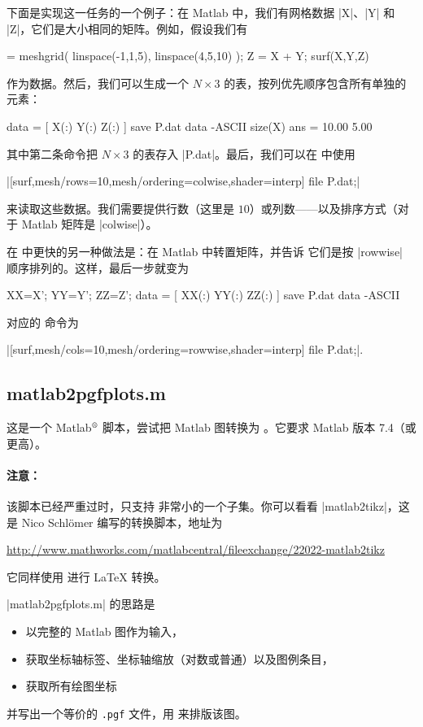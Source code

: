 {\begin{pgfgraphicnamed}
下面是实现这一任务的一个例子：在 Matlab 中，我们有网格数据 |X|、|Y| 和 |Z|，它们是大小相同的矩阵。例如，假设我们有
%
\begin{codeexample} = meshgrid( linspace(-1,1,5), linspace(4,5,10) );
Z = X + Y;
surf(X,Y,Z)
\end{codeexample}
%
\noindent 作为数据。然后，我们可以生成一个 $N \times 3$ 的表，按列优先顺序包含所有单独的元素：
%
\begin{codeexample}
data = [ X(:) Y(:) Z(:) ]
save P.dat data -ASCII
size(X)
ans =
   10.00    5.00
\end{codeexample}
%
\noindent 其中第二条命令把 $N \times 3$ 的表存入 |P.dat|。最后，我们可以在 \PGFPlots{} 中使用

|[surf,mesh/rows=10,mesh/ordering=colwise,shader=interp] file {P.dat};|

来读取这些数据。我们需要提供行数（这里是 $10$）或列数——以及排序方式（对于 Matlab 矩阵是 |colwise|）。

在 \PGFPlots{} 中更快的另一种做法是：在 Matlab 中转置矩阵，并告诉 \PGFPlots{} 它们是按 |rowwise| 顺序排列的。这样，最后一步就变为
%
\begin{codeexample}
XX=X'; YY=Y'; ZZ=Z';
data = [ XX(:) YY(:) ZZ(:) ]
save P.dat data -ASCII
\end{codeexample}
%
\noindent 对应的 \PGFPlots{} 命令为

|[surf,mesh/cols=10,mesh/ordering=rowwise,shader=interp] file {P.dat};|.


\subsection{matlab2pgfplots.m}

这是一个 Matlab$^\text{\textregistered}$ 脚本，尝试把 Matlab 图转换为 \PGFPlots{}。它要求 Matlab 版本 7.4（或更高）。


\paragraph{注意：}

该脚本已经严重过时，只支持 \PGFPlots{} 非常小的一个子集。你可以看看 |matlab2tikz|，这是 Nico Schlömer 编写的转换脚本，地址为

\url{http://www.mathworks.com/matlabcentral/fileexchange/22022-matlab2tikz}

\noindent 它同样使用 \PGFPlots{} 进行 \LaTeX{} 转换。

\medskip
|matlab2pgfplots.m| 的思路是
%
\begin{itemize}
    \item 以完整的 Matlab 图作为输入，
    \item 获取坐标轴标签、坐标轴缩放（对数或普通）以及图例条目，
    \item 获取所有绘图坐标
\end{itemize}
%
并写出一个等价的 \texttt{.pgf} 文件，用 \PGFPlots{} 来排版该图。


\end{pgfgraphicnamed}}

